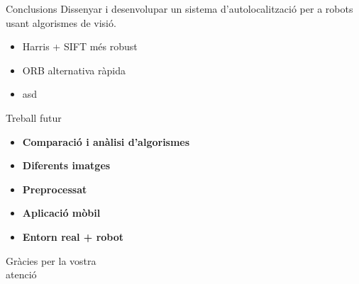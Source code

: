 \documentclass[xcolor=table, 11pt]{beamer}
\newcommand\tz{\fontsize{13}{15.6}\selectfont}
\begin{document}
	\begin{frame}{Conclusions}
		\tz
		Dissenyar i desenvolupar un sistema d'autolocalització per a robots usant algorismes de visió.\\
		\vspace{1em}

		\begin{itemize}
			\item Harris + SIFT més robust
			\item ORB alternativa ràpida
			\item asd
		\end{itemize}
	\end{frame}

	\begin{frame}{Treball futur}
		\tz
		\begin{itemize}
			\item{\textbf{Comparació i anàlisi d'algorismes}}
			\item{\textbf{Diferents imatges}}
			\item{\textbf{Preprocessat}}
			\item{\textbf{Aplicació mòbil}}
			\item{\textbf{Entorn real + robot}}
		\end{itemize}
	\end{frame}

	\begin{frame}
		\Huge{Gràcies per la vostra\\atenció}
	\end{frame}

	\appendix

	\begin{frame}[allowframebreaks]
		\printbibliography
	\end{frame}
\end{document}

